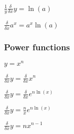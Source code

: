 \(\frac{1}{y}\frac{\delta }{\delta x}y=\ln(a)\)

\(\frac{\delta }{\delta x}a^x=a^x\ln(a)\)

\subsubsection{Power functions}

\(y=x^n\)

\(\frac{\delta }{\delta x}y=\frac{\delta }{\delta x}x^n\)

\(\frac{\delta }{\delta x}y=\frac{\delta }{\delta x}e^{n\ln(x)}\)

\(\frac{\delta }{\delta x}y=\frac{n}{x}e^{n\ln(x)}\)

\(\frac{\delta }{\delta x}y=nx^{n-1}\)

